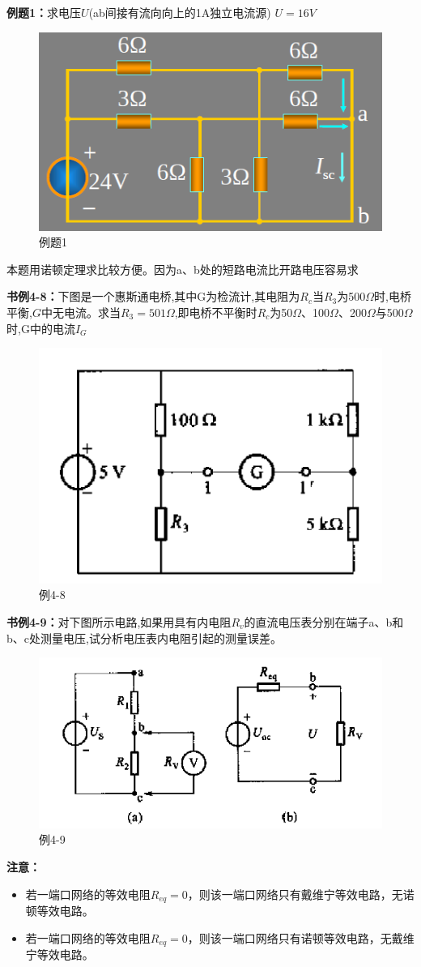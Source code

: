\documentclass[11pt,a4paper,oneside]{book}
\begin{document}
\noindent\textbf{例题1：}求电压$U$(ab间接有流向向上的1A独立电流源) \quad $U=16V$
\begin{figure}[H]
	\centering
	\includegraphics[width=0.5\linewidth]{screenshot072}
	\caption{例题1}
	\label{fig:screenshot072}
\end{figure}
本题用诺顿定理求比较方便。因为a、b处的短路电流比开路电压容易求

\newpage
\noindent\textbf{书例4-8：}下图是一个惠斯通电桥,其中G为检流计,其电阻为$R_c$当$R_3$为500$\Omega$时,电桥平衡,$G$中无电流。求当$R_3=501\Omega$,即电桥不平衡时$R_c$为50$\Omega$、100$\Omega$、200$\Omega$与500$\Omega$时,G中的电流$I_G$
\begin{figure}[H]
	\centering
	\includegraphics[width=0.5\linewidth]{screenshot074}
	\caption{例4-8}
	\label{fig:screenshot074}
\end{figure}

\noindent\textbf{书例4-9：}对下图所示电路,如果用具有内电阻$R_v$的直流电压表分别在端子a、b和b、c处测量电压,试分析电压表内电阻引起的测量误差。
\begin{figure}[H]
	\centering
	\includegraphics[width=0.5\linewidth]{screenshot075}
	\caption{例4-9}
	\label{fig:screenshot075}
\end{figure}

\noindent\textbf{注意：}
\begin{itemize}
	\item 若一端口网络的等效电阻$R_{eq}=0$，则该一端口网络只有戴维宁等效电路，无诺顿等效电路。
	\item 若一端口网络的等效电阻$R_{eq}=0$，则该一端口网络只有诺顿等效电路，无戴维宁等效电路。
\end{itemize}
\end{document}
